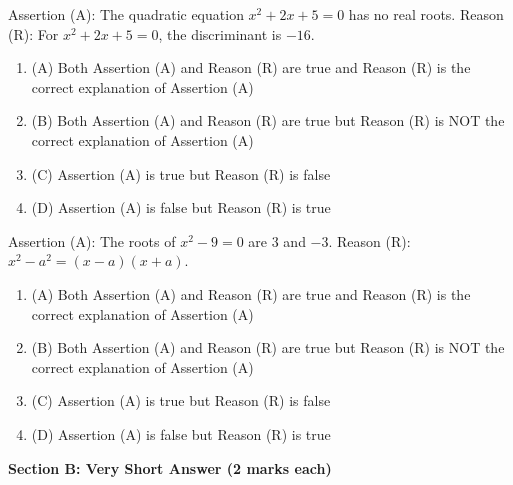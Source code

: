 \documentclass[12pt,a4paper]{exam}
\begin{document}
\begin{questions}
\question[1] Assertion (A): The quadratic equation $x^2 + 2x + 5 = 0$ has no real roots. Reason (R): For $x^2 + 2x + 5 = 0$, the discriminant is $-16$.
\begin{enumerate}[label=(\Alph*)]
  \item (A) Both Assertion (A) and Reason (R) are true and Reason (R) is the correct explanation of Assertion (A)
  \item (B) Both Assertion (A) and Reason (R) are true but Reason (R) is NOT the correct explanation of Assertion (A)
  \item (C) Assertion (A) is true but Reason (R) is false
  \item (D) Assertion (A) is false but Reason (R) is true
\end{enumerate}
\vspace{0.15cm}

\question[1] Assertion (A): The roots of $x^2 - 9 = 0$ are $3$ and $-3$. Reason (R): $x^2 - a^2 = (x-a)(x+a)$.
\begin{enumerate}[label=(\Alph*)]
  \item (A) Both Assertion (A) and Reason (R) are true and Reason (R) is the correct explanation of Assertion (A)
  \item (B) Both Assertion (A) and Reason (R) are true but Reason (R) is NOT the correct explanation of Assertion (A)
  \item (C) Assertion (A) is true but Reason (R) is false
  \item (D) Assertion (A) is false but Reason (R) is true
\end{enumerate}
\vspace{0.15cm}

\end{questions}
\bigskip
\noindent\textbf{\large Section B: Very Short Answer (2 marks each)}
\end{document}

